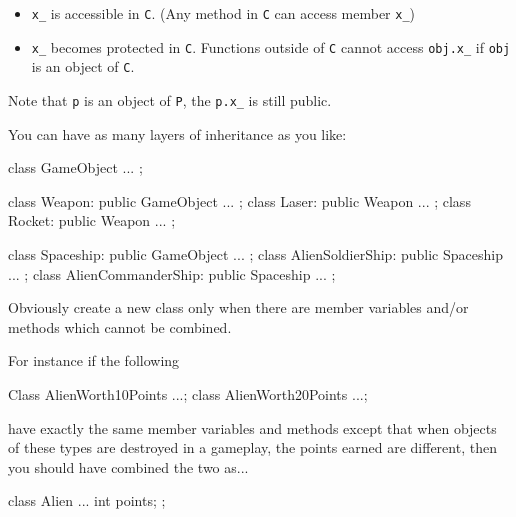 \begin{itemize}
\item
  \verb!x_! is accessible in \verb!C!. (Any method in \verb!C! can
  access member \verb!x_!)
\item
  \verb!x_! becomes protected in \verb!C!. Functions outside of
  \verb!C! cannot access \verb!obj.x_! if \verb!obj! is an object of
  \verb!C!.
\end{itemize}

Note that \verb!p! is an object of \verb!P!, the \verb!p.x_! is still public.

You can have as many layers of inheritance as you like:
\begin{console}
class GameObject { ... };

class Weapon: public GameObject { ... };
class Laser: public Weapon { ... };
class Rocket: public Weapon { ... };

class Spaceship: public GameObject { ... };
class AlienSoldierShip: public Spaceship { ... };
class AlienCommanderShip: public Spaceship { ... };
\end{console}

Obviously create a new class only when there are member variables and/or
methods which cannot be combined.

For instance if the following
\begin{console}
Class AlienWorth10Points {...};
class AlienWorth20Points {...};
\end{console}

have exactly the same member variables and methods except that when
objects of these types are destroyed in a gameplay, the points earned
are different, then you should have combined the two as...
\begin{console}
class Alien
{
...
    int points;
}; 
\end{console}

